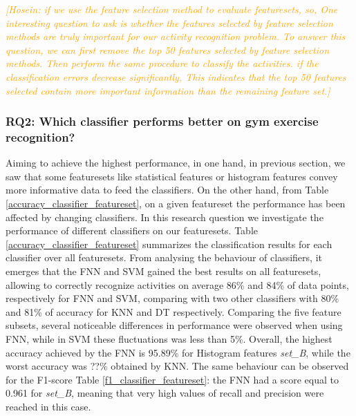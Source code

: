 \documentclass[journal,article,submit,moreauthors,pdftex]{Definitions/mdpi}
\newcommand{\hosein}[1]{\textcolor{orange}{{\it [Hosein: #1]}}}
\begin{document}
\hosein{if we use the feature selection method to evaluate featuresets, so, One interesting question to ask is whether the features selected by feature selection methods are truly important for our activity recognition problem. To answer this question, we can first remove the top 50 features selected by feature selection methods. Then perform the same procedure to classify the activities. if the classification errors decrease significantly, This indicates that the top 50 features selected contain more important information than the remaining feature set.}
\subsubsection{RQ2: Which classifier performs better on gym exercise recognition?}
Aiming to achieve the highest performance, in one hand, in previous section, we saw that some featuresets like statistical features or histogram features convey more informative data to feed the classifiers. On the other hand, from Table \ref{accuracy_classifier_featureset}, on a given featureset the performance has been affected by changing classifiers. In this research question we investigate the performance of different classifiers on our featuresets. Table \ref{accuracy_classifier_featureset} summarizes the classification results for each classifier over all featuresets. From analysing the behaviour of classifiers, it emerges that the FNN and SVM gained the best results on all featuresets, allowing to correctly recognize activities on average 86\% and 84\% of data points, respectively for FNN and SVM, comparing with two other classifiers with 80\% and 81\% of accuracy for KNN and DT respectively. Comparing the five feature subsets, several noticeable differences in performance were observed when using FNN, while in SVM these fluctuations was less than 5\%. Overall, the highest accuracy achieved by the FNN is 95.89\% for Histogram features \textit{set\_B}, while the worst accuracy was ??\% obtained by KNN. The same behaviour can be observed for the F1-score Table \ref{f1_classifier_featureset}: the FNN had a score equal to 0.961 for \textit{set\_B}, meaning that very high values of recall and precision were reached in this case.
\end{document}
